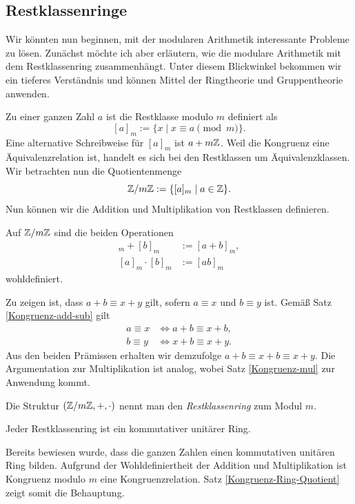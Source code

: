 \subsection{Restklassenringe}

Wir könnten nun beginnen, mit der modularen Arithmetik interessante
Probleme zu lösen. Zunächst möchte ich aber erläutern, wie die
modulare Arithmetik mit dem Restklassenring zusammenhängt. Unter
diesem Blickwinkel bekommen wir ein tieferes Verständnis und können
Mittel der Ringtheorie und Gruppentheorie anwenden.

Zu einer ganzen Zahl $a$ ist die Restklasse modulo $m$ definiert als 
\[[a]_m := \{x\mid x\equiv a\pmod m\}.\]
Eine alternative Schreibweise für $[a]_m$ ist $a+m\mathbb Z$. Weil die
Kongruenz eine Äquivalenzrelation ist, handelt es sich bei den
Restklassen um Äquivalenzklassen. Wir betrachten nun die
Quotientenmenge
\[\mathbb Z/m\mathbb Z := \{[a]_m\mid a\in\mathbb Z\}.\]
Nun können wir die Addition und Multiplikation von Restklassen
definieren.
\begin{Satz}
Auf $\mathbb Z/m\mathbb Z$ sind die beiden Operationen
\begin{align*}
[a]_m + [b]_m &:= [a+b]_m,\\
[a]_m\cdot [b]_m &:= [ab]_m
\end{align*}
wohldefiniert.
\end{Satz}
 Zu zeigen ist, dass $a+b\equiv x+y$ gilt, sofern
$a\equiv x$ und $b\equiv y$ ist. Gemäß Satz \ref{Kongruenz-add-sub} gilt
\begin{align*}
a\equiv x &\iff a+b\equiv x+b,\\
b\equiv y &\iff x+b\equiv x+y.
\end{align*}
Aus den beiden Prämissen erhalten wir demzufolge
$a+b\equiv x+b\equiv x+y$.
Die Argumentation zur Multiplikation ist analog, wobei
Satz \ref{Kongruenz-mul} zur Anwendung kommt.\,\qedsymbol

Die Struktur $(\mathbb Z/m\mathbb Z,+,\cdot)$ nennt man den \emph{Restklassenring}
zum Modul $m$.

\begin{Satz}
Jeder Restklassenring ist ein kommutativer unitärer Ring.
\end{Satz}
\begin{Beweis}
Bereits bewiesen wurde, dass die ganzen Zahlen einen
kommutativen unitären Ring bilden. Aufgrund der Wohldefiniertheit der
Addition und Multiplikation ist Kongruenz modulo $m$ eine
Kongruenzrelation. Satz \ref{Kongruenz-Ring-Quotient} zeigt somit die
Behauptung.\,\qedsymbol
\end{Beweis}

